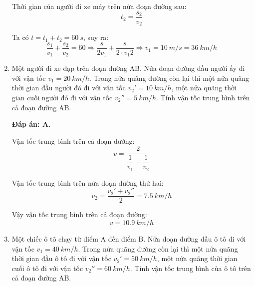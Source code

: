 \begin{enumerate}[label=\bfseries Câu \arabic*:]
{		Thời gian của người đi xe máy trên nửa đoạn đường sau:
		$$t_2=\dfrac{s_2}{v_2}$$
		
		Ta có $t=t_1+t_2=\SI{60}{s}$, suy ra:
		$$\dfrac{s_1}{v_1} +\dfrac{s_2}{v_2} = 60 \Rightarrow \dfrac{s}{2v_1}+\dfrac{s}{2\cdot{v_1}{2}} \Rightarrow v_1 = \SI{10}{m/s} = \SI{36}{km/h}$$
	}
	\item {}
	
	
	{Một người đi xe đạp trên đoạn đường AB. Nửa đoạn đường đầu người ấy đi với vận tốc $v_1=\SI{20}{km/h}$. Trong nửa quãng đường còn lại thì một nửa quãng thời gian đầu người đó đi với vận tốc $v_2'=\SI{10}{km/h}$, một nửa quãng thời gian cuối người đó đi với vận tốc $v_2''=\SI{5}{km/h}$. Tính vận tốc trung bình trên cả đoạn đường AB. 
		
		
	}
	
	\hideall
	{\textbf{Đáp án: A.}
		
		Vận tốc trung bình trên cả đoạn đường:
		$$v=\dfrac{2}{\dfrac{1}{v_1}+\dfrac{1}{v_2}}$$
		
		Vận tốc trung bình trên nửa đoạn đường thứ hai:
		$$v_2=\dfrac{v_2'+v_2''}{2} = \SI{7.5}{km/h}$$
		
		Vậy vận tốc trung bình trên cả đoạn đường:
		$$v=\SI{10.9}{km/h}$$
	}
	\item {}
	
	
	{Một chiếc ô tô chạy từ điểm A đến điểm B. Nửa đoạn đường đầu ô tô đi với vận tốc $v_1=\SI{40}{km/h}$. Trong nửa quãng đường còn lại thì một nửa quãng thời gian đầu ô tô đi với vận tốc $v_2'=\SI{50}{km/h}$, một nửa quãng thời gian cuối ô tô đi với vận tốc $v_2''=\SI{60}{km/h}$. Tính vận tốc trung bình của ô tô trên cả đoạn đường AB. 
		
		
}
\end{enumerate}
